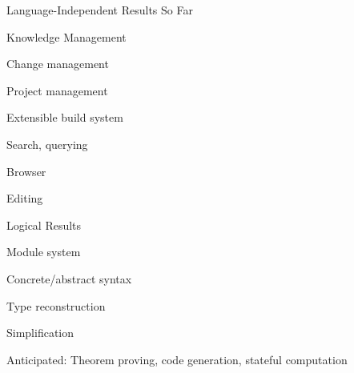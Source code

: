 \documentclass{beamer}
\renewcommand{\emph}[1]{\alert{#1}}
\begin{document}

\begin{myframe}{Language-Independent Results So Far}
\begin{blockitems}{Knowledge Management}
		\item Change management
		\item Project management
		\item Extensible build system
		\item Search, querying
		\item Browser
		\item Editing
\end{blockitems}

\begin{blockitems}{Logical Results}
		\item Module system
		\item Concrete/abstract syntax
		\item Type reconstruction
		\item Simplification
		\item Anticipated: Theorem proving, code generation, stateful computation
\end{blockitems}
\end{myframe}
\end{document}
